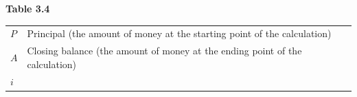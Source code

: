 \begin{itemize}[noitemsep]
{{\begin{center}
\begin{tabular}[t]{|l|l|}
     \tabularnewline\cline{1-1}\cline{2-2}
    \end{tabular}
      \end{center}
    \begin{center}{\small\bfseries Table 3.4}\end{center}
          }{ %
        \begin{center}
      \label{m39335*id75382}
    \noindent
      \tablelasttail{}
      \begin{xtabular}[t]{|l|l|}\hline
                  $P$
                 &
        Principal (the amount of money at the starting point of the calculation)%
     \tabularnewline{}
                  $A$
                 &
        Closing balance (the amount of money at the ending point of the calculation)%
     \tabularnewline{}
                  $i$
                 &

\end{xtabular}
\end{center}}}
\end{itemize}
